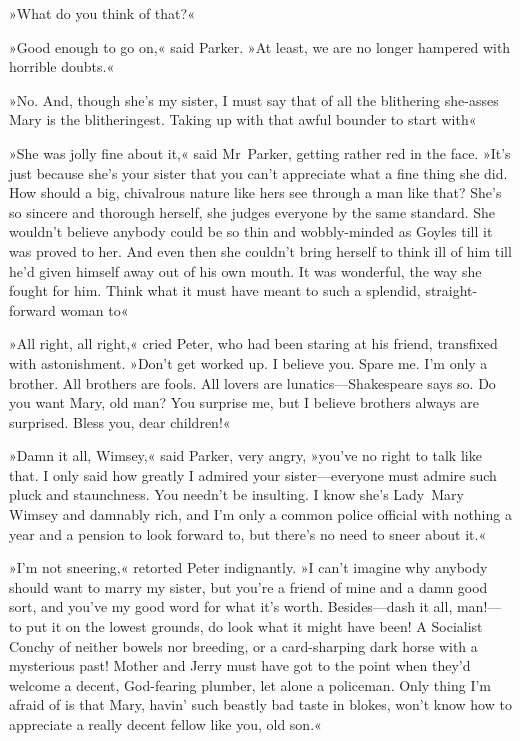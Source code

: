 »What do you think of that?«

»Good enough to go on,« said Parker. »At least, we are no longer hampered with horrible doubts.«

»No. And, though she's my sister, I must say that of all the blithering she-asses Mary is the blitheringest. Taking up with that awful bounder to start with\longdash«

»She was jolly fine about it,« said Mr~Parker, getting rather red in the face. »It's just because she's your sister that you can't appreciate what a fine thing she did. How should a big, chivalrous nature like hers see through a man like that? She's so sincere and thorough herself, she judges everyone by the same standard. She wouldn't believe anybody could be so thin and wobbly-minded as Goyles till it was proved to her. And even then she couldn't bring herself to think ill of him till he'd given himself away out of his own mouth. It was wonderful, the way she fought for him. Think what it must have meant to such a splendid, straight-forward woman to\longdash«

»All right, all right,« cried Peter, who had been staring at his friend, transfixed with astonishment. »Don't get worked up. I believe you. Spare me. I'm only a brother. All brothers are fools. All lovers are lunatics—Shakespeare says so. Do you want Mary, old man? You surprise me, but I believe brothers always are surprised. Bless you, dear children!«

»Damn it all, Wimsey,« said Parker, very angry, »you've no right to talk like that. I only said how greatly I admired your sister—everyone must admire such pluck and staunchness. You needn't be insulting. I know she's Lady~Mary Wimsey and damnably rich, and I'm only a common police official with nothing a year and a pension to look forward to, but there's no need to sneer about it.«

»I'm not sneering,« retorted Peter indignantly. »I can't imagine why anybody should want to marry my sister, but you're a friend of mine and a damn good sort, and you've my good word for what it's worth. Besides—dash it all, man!—to put it on the lowest grounds, do look what it might have been! A Socialist Conchy of neither bowels nor breeding, or a card-sharping dark horse with a mysterious past! Mother and Jerry must have got to the point when they'd welcome a decent, God-fearing plumber, let alone a policeman. Only thing I'm afraid of is that Mary, havin' such beastly bad taste in blokes, won't know how to appreciate a really decent fellow like you, old son.«

